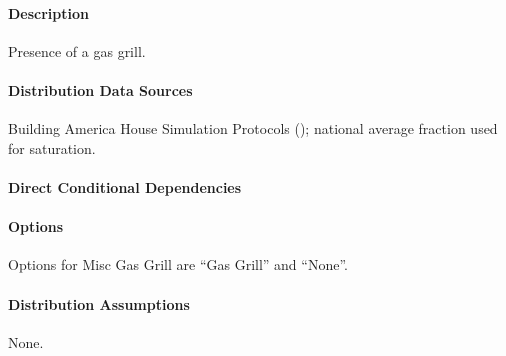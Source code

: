 \paragraph{Description}
% 
Presence of a gas grill.

\paragraph{Distribution Data Sources}
% 
Building America House Simulation Protocols (\cite{Wilson2014}); national average fraction used for saturation.

\paragraph{Direct Conditional Dependencies}


\paragraph{Options}
Options for Misc Gas Grill are ``Gas Grill'' and ``None''.

\paragraph{Distribution Assumptions}
% 
None.
